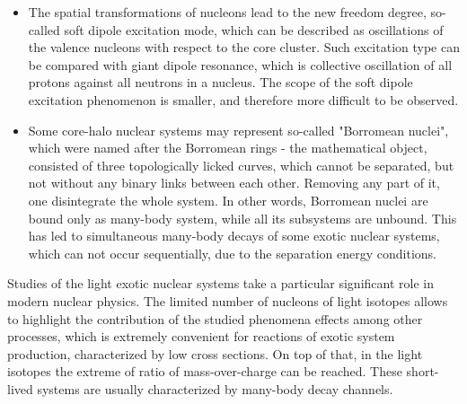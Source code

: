\begin{itemize}
	\item 
		
	The spatial transformations of nucleons lead to the new freedom degree, so-called soft dipole excitation mode, which can be described as oscillations of the valence nucleons with respect to the core cluster. 
	Such excitation type can be compared with giant dipole resonance, which is collective oscillation of all protons against all neutrons in a nucleus.
	The scope of the soft dipole excitation phenomenon is smaller, and therefore more difficult to be observed. 
	
	\item 
	Some core-halo nuclear systems may represent so-called "Borromean nuclei", which were named after the Borromean rings - the mathematical object, consisted of three topologically licked curves, which cannot be separated, but not without any binary links between each other.
	Removing any part of it, one disintegrate the whole system.
	In other words, Borromean nuclei are bound only as many-body system, while all its subsystems are unbound.
	This has led to simultaneous many-body decays of some exotic nuclear systems, which can not occur sequentially, due to the separation energy conditions.
	

\end{itemize}



Studies of the light exotic nuclear systems take a particular significant role in modern nuclear physics.
The limited number of nucleons of light isotopes allows to highlight the contribution of the studied phenomena effects among other processes, which is extremely convenient for reactions of exotic system production, characterized by low cross sections.
On top of that, in the light isotopes the extreme of ratio of mass-over-charge can be reached.
These short-lived systems are usually characterized by many-body decay channels.

